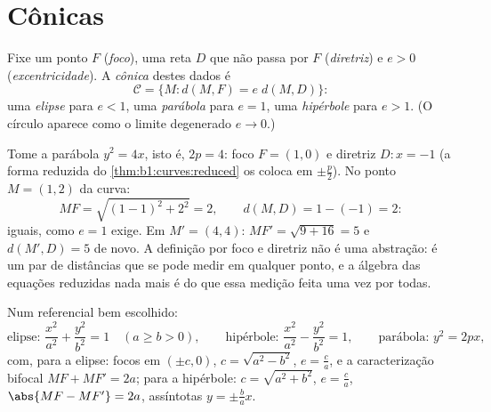 \section{Cônicas}

\begin{definition}\label{def:b1:curves:conics}
Fixe um ponto $F$ (\emph{foco}), uma reta $D$ que não passa por $F$
(\emph{diretriz}) e $e > 0$ (\emph{excentricidade}). A
\emph{cônica} destes dados é
\[
\mathcal{C} = \{M : d(M, F) = e\; d(M, D)\}:
\]
uma \emph{elipse} para $e < 1$, uma \emph{parábola} para $e = 1$, uma
\emph{hipérbole} para $e > 1$. (O círculo aparece como o limite
degenerado $e \to 0$.)
\end{definition}

\begin{example}
\label{ex:b1:curves:parabolacheck}
Tome a parábola $y^2 = 4x$, isto é, $2p = 4$: foco $F = (1, 0)$ e diretriz $D : x = -1$
(a forma reduzida do \cref{thm:b1:curves:reduced} os coloca em $\pm\frac p2$). No ponto $M = (1, 2)$ da
curva:
\[
MF = \sqrt{(1-1)^2 + 2^2} = 2,
\qquad
d(M, D) = 1 - (-1) = 2 :
\]
iguais, como $e = 1$ exige. Em $M' = (4, 4)$: $MF' = \sqrt{9 +
16} = 5$ e $d(M', D) = 5$ de novo. A
definição por foco e diretriz não é uma abstração: é um par de
distâncias que se pode medir em qualquer ponto, e a álgebra das
equações reduzidas nada mais é do que essa medição feita uma vez por
todas.
\end{example}

\begin{theorem}\label{thm:b1:curves:reduced}
Num referencial  bem escolhido:
\[
\text{elipse: } \frac{x^2}{a^2} + \frac{y^2}{b^2} = 1
\quad (a \geq b > 0),
\qquad
\text{hipérbole: } \frac{x^2}{a^2} - \frac{y^2}{b^2} = 1,
\qquad
\text{parábola: } y^2 = 2px,
\]
com, para a elipse: focos em $(\pm c, 0)$, $c = \sqrt{a^2 - b^2}$, $e = \frac ca$, e a caracterização
bifocal $MF + MF' = 2a$; para a hipérbole: $c = \sqrt{a^2 + b^2}$, $e = \frac ca$, $\abs{MF - MF'} = 2a$, assíntotas
$y = \pm\frac ba x$.
\end{theorem}

